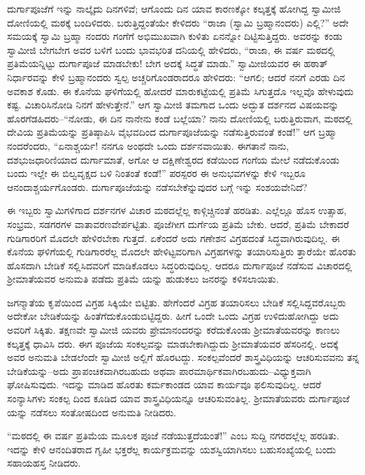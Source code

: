 ದುರ್ಗಾಪೂಜೆಗೆ ಇನ್ನು ನಾಲ್ಕೈದು ದಿನಗಳಿವೆ; ಆಗೊಂದು ದಿನ ಯಾವ ಕಾರಣಕ್ಕೋ ಕಲ್ಕತ್ತಕ್ಕೆ ಹೋಗಿದ್ದ ಸ್ವಾಮೀಜಿ ದೋಣಿಯಲ್ಲಿ ಮಠಕ್ಕೆ ಬಂದಿಳಿದರು. ಬರುತ್ತಿದ್ದಂತೆಯೇ ಕೇಳಿದರು “ರಾಜಾ (ಸ್ವಾಮಿ ಬ್ರಹ್ಮಾನಂದರು) ಎಲ್ಲಿ?” ಅದೇ ಸಮಯಕ್ಕೆ ಸ್ವಾಮಿ ಬ್ರಹ್ಮಾ ನಂದರು ಗಂಗೆಗೆ ಅಭಿಮುಖವಾಗಿ ಕುಳಿತು ಏನನ್ನೋ ದಿಟ್ಟಿಸುತ್ತಿದ್ದರು. ಅವರನ್ನು ಕಂಡು ಸ್ವಾಮೀಜಿ ಬೇಗಬೇಗ ಅವರ ಬಳಿಗೆ ಬಂದು ಭಾವಭರಿತ ದನಿಯಲ್ಲಿ ಹೇಳಿದರು, “ರಾಜಾ, ಈ ವರ್ಷ ಮಠದಲ್ಲಿ ಪ್ರತಿಮೆಯನ್ನಿಟ್ಟು ದುರ್ಗಾಪೂಜೆ ಮಾಡಬೇಕು! ಬೇಗ ಅದಕ್ಕೆ ಸಿದ್ಧತೆ ಮಾಡು.” ಸ್ವಾಮೀಜಿಯವರ ಈ ಹಠಾತ್ ನಿರ್ಧಾರವನ್ನು ಕೇಳಿ ಬ್ರಹ್ಮಾನಂದರು ಸ್ವಲ್ಪ ಅಚ್ಚರಿಗೊಂಡರಾದರೂ ಹೇಳಿದರು: “ಆಗಲಿ; ಆದರೆ ನನಗೆ ಎರಡು ದಿನ ಅವಕಾಶ ಕೊಡು. ಈ ಕೊನೆಯ ಘಳಿಗೆಯಲ್ಲಿ ಹೋದರೆ ಮಾರುಕಟ್ಟೆಯಲ್ಲಿ ಪ್ರತಿಮೆ ಸಿಗುತ್ತದೊ ಇಲ್ಲವೊ ಹೇಳುವುದು ಕಷ್ಟ. ವಿಚಾರಿಸಿನೋಡಿ ನಿನಗೆ ಹೇಳುತ್ತೇನೆ.” ಆಗ ಸ್ವಾಮೀಜಿ ತಮಗಾದ ಒಂದು ಅದ್ಭುತ ದರ್ಶನದ ವಿಷಯವನ್ನು ಹೊರಗೆಡಹಿದರು–“ನೋಡು, ಈ ದಿನ ನಾನೇನು ಕಂಡೆ ಬಲ್ಲೆಯಾ? ನಾನು ದೋಣಿಯಲ್ಲಿ ಬರುತ್ತಿರುವಾಗ, ಮಠದಲ್ಲಿ ದೇವಿಯ ಪ್ರತಿಮೆಯನ್ನು ಪ್ರತಿಷ್ಠಾಪಿಸಿ ವೈಭವದಿಂದ ದುರ್ಗಾಪೂಜೆಯನ್ನು ನಡೆಸುತ್ತಿರುವಂತೆ ಕಂಡೆ!” ಆಗ ಬ್ರಹ್ಮಾ ನಂದರೆಂದರು, “ಏನಾಶ್ಚರ್ಯ! ನನಗೂ ಅಂಥದೇ ಒಂದು ದರ್ಶನವಾಯಿತು. ಈಗತಾನೆ ನಾನು, ದಶಭುಜಧಾರಿಣಿಯಾದ ದುರ್ಗಾಮಾತೆ, ಅಗೋ ಆ ದಕ್ಷಿಣೇಶ್ವರದ ಕಡೆಯಿಂದ ಗಂಗೆಯ ಮೇಲೆ ನಡೆದುಕೊಂಡು ಬಂದು ಇಲ್ಲೇ ಈ ಬಿಲ್ವವೃಕ್ಷದ ಬಳಿ ನಿಂತಂತೆ ಕಂಡೆ!” ಪರಸ್ಪರರ ಈ ಅನುಭವಗಳನ್ನು ಕೇಳಿ ಇಬ್ಬರೂ ಆನಂದಾಶ್ಚರ್ಯಗೊಂಡರು. ದುರ್ಗಾಪೂಜೆಯನ್ನು ನಡೆಸಬೇಕೆನ್ನುವುದರ ಬಗ್ಗೆ ಇನ್ನು ಸಂಶಯವೇನಿದೆ?

ಈ ಇಬ್ಬರು ಸ್ವಾಮಿಗಳಿಗಾದ ದರ್ಶನಗಳ ವಿಚಾರ ಮಠದಲ್ಲೆಲ್ಲ ಕಾಳ್ಗಿಚ್ಚಿನಂತೆ ಹರಡಿತು. ಎಲ್ಲೆಲ್ಲೂ ಹೊಸ ಉತ್ಸಾಹ, ಸಂಭ್ರಮ, ಸಡಗರಗಳ ವಾತಾವರಣವೇರ್ಪಟ್ಟಿತು. ಪೂಜೆಗೀಗ ದುರ್ಗೆಯ ಪ್ರತಿಮೆ ಬೇಕು. ಆದರೆ, ಪ್ರತಿಮೆ ಬೇಕಾದರೆ ಗುಡಿಗಾರರಿಗೆ ಮೊದಲೇ ಹೇಳಿರಬೇಕಾ ಗುತ್ತದೆ. ಏಕೆಂದರೆ ಅದು ಗಣೇಶನ ವಿಗ್ರಹದಂತೆ ಸಿದ್ಧವಾಗಿರುವುದಿಲ್ಲ. ಈ ಕೊನೆಯ ಘಳಿಗೆಯಲ್ಲಿ ಗುಡಿಗಾರರೆಲ್ಲ ಮೊದಲೇ ಹೇಳಿಟ್ಟವರಿಗಾಗಿ ವಿಗ್ರಹಗಳನ್ನು ತಯಾರಿಸುತ್ತಿರು ತ್ತಾರೆಯೇ ಹೊರತು ಹೊಸದಾಗಿ ಬೇಡಿಕೆ ಸಲ್ಲಿಸಿದವರಿಗೆ ಮಾಡಿಕೊಡಲು ಸಿದ್ಧರಿರುವುದಿಲ್ಲ. ಆದರೂ ದುರ್ಗಾಪೂಜೆ ನಡೆಸುವ ವಿಚಾರದಲ್ಲಿ ಶ್ರೀಮಾತೆಯವರ ಅನುಮತಿ ಪಡೆದು ಪ್ರತಿಮೆ ಯನ್ನು ಹುಡುಕಲು ಜನರನ್ನು ಕಳಿಸಲಾಯಿತು.

ಜಗನ್ಮಾತೆಯ ಕೃಪೆಯಿಂದ ವಿಗ್ರಹ ಸಿಕ್ಕಿಯೇ ಬಿಟ್ಟಿತು. ಹೇಗೆಂದರೆ ವಿಗ್ರಹ ತಯಾರಿಸಲು ಬೇಡಿಕೆ ಸಲ್ಲಿಸಿದ್ದವರೊಬ್ಬರು ಅದೇಕೋ ಬೇಡಿಕೆಯನ್ನು ಹಿಂತೆಗೆದುಕೊಂಡುಬಿಟ್ಟಿದ್ದರು. ಹೀಗೆ ಒಂದೇ ಒಂದು ವಿಗ್ರಹ ಉಳಿದುಹೋಗಿದ್ದು ಅದು ಅವರಿಗೆ ಸಿಕ್ಕಿತು. ತಕ್ಷಣವೇ ಸ್ವಾಮೀಜಿ ಯವರು ಪ್ರೇಮಾನಂದರನ್ನು ಕರೆದುಕೊಂಡು ಶ್ರೀಮಾತೆಯವರನ್ನು ಕಾಣಲು ಕಲ್ಕತ್ತಕ್ಕೆ ಧಾವಿಸಿ ದರು. ಈಗ ಪೂಜೆಯ ಸಂಕಲ್ಪವನ್ನು ಮಾಡಬೇಕಾಗಿದ್ದುದು ಶ್ರೀಮಾತೆಯವರ ಹೆಸರಿನಲ್ಲಿ. ಅದಕ್ಕೆ ಅವರ ಅನುಮತಿ ಬೇಡಲೆಂದೇ ಸ್ವಾಮೀಜಿ ಅಲ್ಲಿಗೆ ಹೊರಟದ್ದು. ಸಂಕಲ್ಪವೆಂದರೆ ಶಾಸ್ತ್ರವಿಧಿಯನ್ನು ಆಚರಿಸುವವನು ತನ್ನ ಬೇಡಿಕೆಯನ್ನು–ಅದು ಪ್ರಾಪಂಚಿಕವಾಗಿರಬಹುದು ಅಥವಾ ಪಾರಮಾರ್ಥಿಕವಾಗಿರಬಹುದು–ವಿಧ್ಯುಕ್ತವಾಗಿ ಘೋಷಿಸುವುದು. ಇದನ್ನು ಮಾಡಿದ ಹೊರತು ಕರ್ಮಕಾಂಡದ ಯಾವ ಕಾರ್ಯವೂ ಫಲಿಸುವುದಿಲ್ಲ. ಆದರೆ ಸಂನ್ಯಾಸಿಗಳು ಸಂಕಲ್ಪ ದಿಂದ ಕೂಡಿದ ಯಾವ ಶಾಸ್ತ್ರವಿಧಿಯನ್ನೂ ಆಚರಿಸುವಂತಿಲ್ಲ. ಶ್ರೀಮಾತೆಯವರು ದುರ್ಗಾಪೂಜೆ ಯನ್ನು ನಡೆಸಲು ಸಂತೋಷದಿಂದ ಅನುಮತಿ ನೀಡಿದರು.

“ಮಠದಲ್ಲಿ ಈ ವರ್ಷ ಪ್ರತಿಮೆಯ ಮೂಲಕ ಪೂಜೆ ನಡೆಯುತ್ತದೆಯಂತೆ!” ಎಂಬ ಸುದ್ದಿ ನಗರದಲ್ಲೆಲ್ಲ ಹರಡಿತು. ಇದನ್ನು ಕೇಳಿ ಆನಂದಿತರಾದ ಗೃಹೀ ಭಕ್ತರೆಲ್ಲ ಕಾರ್ಯಕ್ರಮವನ್ನು ಯಶಸ್ವಿಯಾಗಿಸಲು ಬಹುಸಂಖ್ಯೆಯಲ್ಲಿ ಬಂದು ಸಹಾಯಹಸ್ತ ನೀಡಿದರು.

